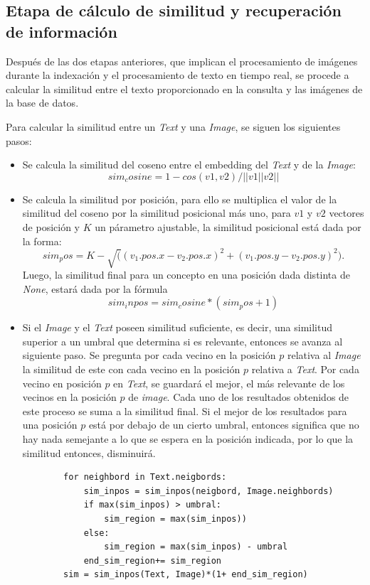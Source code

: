 \subsection{Etapa de cálculo de similitud y recuperación de información}

Después de las dos etapas anteriores, que implican el procesamiento de imágenes durante la indexación y el procesamiento de texto en tiempo real, se procede a calcular la similitud entre el texto proporcionado en la consulta y las imágenes de la base de datos.

Para calcular la similitud entre un \textit{Text} y una \textit{Image}, se siguen los siguientes pasos:
\begin{itemize}

    \item  Se calcula la similitud del coseno entre el embedding del \textit{Text} y de la \textit{Image}: 
    \[sim_cosine = 1- cos(v1,v2)/||v1||v2||\]

    \item  Se calcula la similitud por posici\'on, para ello se multiplica el valor de la similitud del coseno por la similitud posicional m\'as uno, para $v1$ y $v2$ vectores de posici\'on y $K$ un p\'arametro ajustable, la similitud posicional est\'a dada por la forma: 
        \[sim_pos = K- \sqrt((v_1.pos.x - v_2.pos.x)^2+(v_1.pos.y - v_2.pos.y)^2).\]
    Luego, la similitud final para un concepto en una posici\'on dada distinta de \textit{None}, estar\'a dada por la f\'ormula
            \[sim_inpos = sim_cosine *(sim_pos+1)\]
    
    \item Si el \textit{Image} y el \textit{Text} poseen similitud suficiente, es decir, una similitud superior a un umbral que determina si es relevante, entonces se avanza al siguiente paso. Se pregunta por cada vecino en la posici\'on $p$ relativa al \textit{Image} la similitud de este con cada vecino en la posición $p$ relativa a \textit{Text}. Por cada vecino en posici\'on $p$ en \textit{Text}, se guardar\'a el mejor, el m\'as relevante de los vecinos en la posici\'on $p$ de \textit{image}. Cada uno de los resultados obtenidos de este proceso se suma a la similitud final. Si el mejor de los resultados para una posición $p$ está por debajo de un cierto umbral, entonces significa que no hay nada semejante a lo que se espera en la posición indicada, por lo que la similitud entonces, disminuirá.

    \begin{verbatim}
        for neighbord in Text.neigbords:
            sim_inpos = sim_inpos(neigbord, Image.neighbords)
            if max(sim_inpos) > umbral:
                sim_region = max(sim_inpos))
            else:
                sim_region = max(sim_inpos) - umbral
            end_sim_region+= sim_region
        sim = sim_inpos(Text, Image)*(1+ end_sim_region)
    \end{verbatim}
            

\end{itemize}
